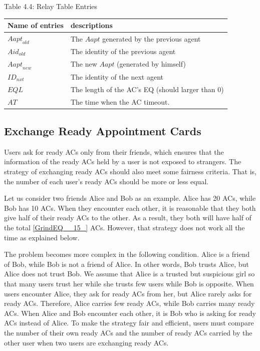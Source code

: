 Table 4.4: Relay Table Entries

\begin{tabular}{|p{1.2in}|p{3.0in}|} \hline 
Name of entries & descriptions \\ \hline 
${Aapt}_{old}$ & The $Aapt$ generated by the previous agent \\ \hline 
${Aid}_{old}$ & The identity of the previous agent \\ \hline 
${Aapt}_{new}$ & The new $Aapt$ (generated by himself) \\ \hline 
${ID}_{nxt}$ & The identity of the next agent \\ \hline 
$EQL$ & The length of the AC's EQ (should larger than 0) \\ \hline 
$AT$ & The time when the AC timeout. \\ \hline 
\end{tabular}

\subsection{ Exchange Ready Appointment Cards}

\noindent Users ask for ready ACs only from their friends, which ensures that the information of the ready ACs held by a user is not exposed to strangers. The strategy of exchanging ready ACs should also meet some fairness criteria. That is, the number of each user's ready ACs should be more or less equal. 

Let us consider two friends Alice and Bob as an example. Alice has 20 ACs, while Bob has 10 ACs. When they encounter each other, it is reasonable that they both give half of their ready ACs to the other. As a result, they both will have half of the total \eqref{GrindEQ__15_} ACs. However, that strategy does not work all the time as explained below.

The problem becomes more complex in the following condition. Alice is a friend of Bob, while Bob is not a friend of Alice. In other words, Bob trusts Alice, but Alice does not trust Bob. We assume that Alice is a trusted but suspicious girl so that many users trust her while she trusts few users while Bob is opposite. When users encounter Alice, they ask for ready ACs from her, but Alice rarely asks for ready ACs. Therefore, Alice carries few ready ACs, while Bob carries many ready ACs. When Alice and Bob encounter each other, it is Bob who is asking for ready ACs instead of Alice. To make the strategy fair and efficient, users must compare the number of their own ready ACs and the number of ready ACs carried by the other user when two users are exchanging ready ACs.

